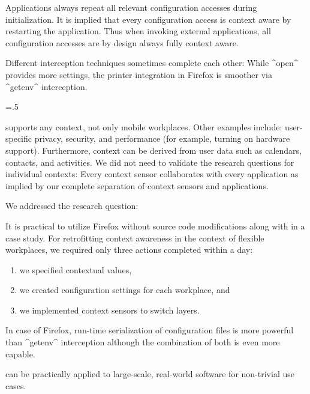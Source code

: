 Applications always repeat all relevant configuration accesses during initialization.
It is implied that every configuration access is context aware by restarting the application.
Thus when invoking external applications, all configuration accesses are by design always fully context aware.

Different interception techniques sometimes complete each other:
While ^open^ provides more settings, the printer integration in Firefox is smoother via ^getenv^ interception.%
{\parfillskip=0pt \emergencystretch=.5\textwidth \par}

\elektra{} supports any context, not only mobile workplaces.
Other examples include: user-specific privacy, security, and performance (for example, turning on hardware support).
Furthermore, context can be derived from user data such as calendars, contacts, and activities.
We did not need to validate the research questions for individual contexts:
Every context sensor collaborates with every application as implied by our complete separation of context sensors and applications.


We addressed the research question:
\rqUnmodifiedPractical*

\begin{finding}
It is practical to utilize Firefox without source code modifications along with \elektra{} in a case study.
For retrofitting context awareness in the context of flexible workplaces, we required only three actions completed within a day:

\begin{enumerate}
\item we specified contextual values,
\item we created configuration settings for each workplace, and
\item we implemented context sensors to switch layers.
\end{enumerate}

In case of Firefox, run-time serialization of configuration files is more powerful than ^getenv^ interception although the combination of both is even more capable.

\begin{implication}
\elektra{} can be practically applied to large-scale, real-world software for non-trivial use cases.
\end{implication}
\end{finding}














